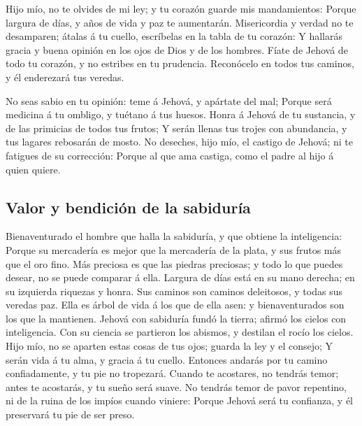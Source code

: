  Hijo mío, no te olvides de mi ley; y tu corazón guarde
mis mandamientos:  Porque largura de días, y años de vida
y paz te aumentarán.  Misericordia y verdad no te
desamparen; átalas á tu cuello, escríbelas en la tabla de tu corazón:
 Y hallarás gracia y buena opinión en los ojos de Dios y
de los hombres.  Fíate de Jehová de todo tu corazón, y no
estribes en tu prudencia.  Reconócelo en todos tus
caminos, y él enderezará tus veredas.

 No seas sabio en tu opinión: teme á Jehová, y apártate
del mal;  Porque será medicina á tu ombligo, y tuétano á
tus huesos.  Honra á Jehová de tu sustancia, y de las
primicias de todos tus frutos;  Y serán llenas tus trojes
con abundancia, y tus lagares rebosarán de mosto.  No
deseches, hijo mío, el castigo de Jehová; ni te fatigues de su
corrección:  Porque al que ama castiga, como el padre al
hijo á quien quiere.

\hypertarget{valor-y-bendiciuxf3n-de-la-sabiduruxeda}{%
\subsection{Valor y bendición de la
sabiduría}\label{valor-y-bendiciuxf3n-de-la-sabiduruxeda}}

 Bienaventurado el hombre que halla la sabiduría, y que
obtiene la inteligencia:  Porque su mercadería es mejor
que la mercadería de la plata, y sus frutos más que el oro fino.
 Más preciosa es que las piedras preciosas; y todo lo que
puedes desear, no se puede comparar á ella.  Largura de
días está en su mano derecha; en su izquierda riquezas y honra.
 Sus caminos son caminos deleitosos, y todas sus veredas
paz.  Ella es árbol de vida á los que de ella asen: y
bienaventurados son los que la mantienen.  Jehová con
sabiduría fundó la tierra; afirmó los cielos con inteligencia.
 Con su ciencia se partieron los abismos, y destilan el
rocío los cielos.  Hijo mío, no se aparten estas cosas de
tus ojos; guarda la ley y el consejo;  Y serán vida á tu
alma, y gracia á tu cuello.  Entonces andarás por tu
camino confiadamente, y tu pie no tropezará.  Cuando te
acostares, no tendrás temor; antes te acostarás, y tu sueño será suave.
 No tendrás temor de pavor repentino, ni de la ruina de
los impíos cuando viniere:  Porque Jehová será tu
confianza, y él preservará tu pie de ser preso.

